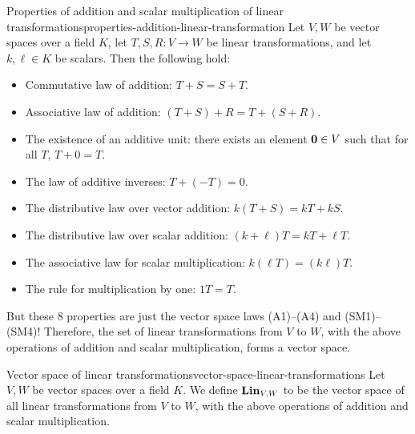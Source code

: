 \begin{proposition}{Properties of addition and scalar multiplication of linear transformations}{properties-addition-linear-transformation}
  Let $V,W$ be vector spaces over a field $K$, let $T,S,R:V\to W$
  be linear transformations, and let $k,\ell\in K$ be scalars. Then
  the following hold:%
  \begin{itemize}\setlength\itemsep{0em}
  \item Commutative law of addition:
    $T+S = S+T$.
  \item Associative law of addition:
    $(T+S)+R = T+(S+R)$.
  \item The existence of an additive unit: there exists an element $\vect{0}\in
    V$ such that for all $T$,
    $T + 0 = T$.
  \item The law of additive inverses:
    $T + (-T) = 0$.
  \item The distributive law over vector addition:
    $k(T + S) = kT + kS$.
  \item The distributive law over scalar addition:
    $(k + \ell) T = k T + \ell T$.
  \item The associative law for scalar multiplication:
    $k(\ell T) = (k \ell)T$.
  \item The rule for multiplication by one:
    $1T=T$.
  \end{itemize}
\end{proposition}

But these 8 properties are just the vector space laws (A1)--(A4) and
(SM1)--(SM4)! Therefore, the set of linear transformations from $V$ to
$W$, with the above operations of addition and scalar multiplication,
forms a vector space.

\begin{definition}{Vector space of linear transformations}{vector-space-linear-transformations}
  Let $V,W$ be vector spaces over a field $K$. We define $\mathbf{Lin}_{V,W}$%
   to be the vector space of all linear
  transformations from $V$ to $W$, with the above operations of
  addition and scalar multiplication.
\end{definition}

